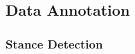 \documentclass[letterpaper]{article} %
\begin{document}
\subsection{Data Annotation}\label{data_annotate}
\subsubsection{Stance Detection}

\end{document}
